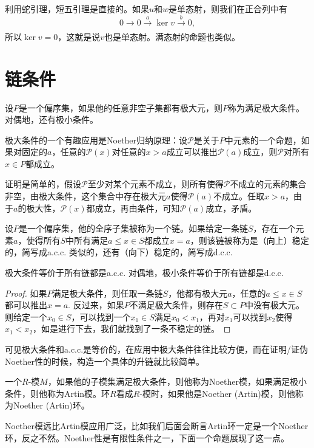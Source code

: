 利用蛇引理，短五引理是直接的。如果$u$和$w$是单态射，则我们在正合列中有
\[
	0\to 0 \xrightarrow[~~~]{a}\ker v \xrightarrow[~~~]{b}0,
\]
所以$\ker v=0$，这就是说$v$也是单态射。满态射的命题也类似。

\section{链条件}

\para 设$P$是一个偏序集，如果他的任意非空子集都有极大元，则$P$称为满足极大条件。对偶地，还有极小条件。

极大条件的一个有趣应用是Noether归纳原理：设$\mathcal{P}$是关于$P$中元素的一个命题，如果对固定的$a$，任意的$\mathcal{P}(x)$对任意的$x>a$成立可以推出$\mathcal{P}(a)$成立，则$\mathcal{P}$对所有$x\in P$都成立。

证明是简单的，假设$\mathcal{P}$至少对某个元素不成立，则所有使得$\mathcal{P}$不成立的元素的集合非空，由极大条件，这个集合中存在极大元$a$使得$\mathcal{P}(a)$不成立。任取$x>a$，由于$a$的极大性，$\mathcal{P}(x)$都成立，再由条件，可知$\mathcal{P}(a)$成立，矛盾。

\para 设$P$是一个偏序集，他的全序子集被称为一个链。如果给定一条链$S$，存在一个元素$a$，使得所有$S$中所有满足$a\leq x\in S$都成立$x=a$，则该链被称为是（向上）稳定的，简写成a.c.c. 类似的，还有（向下）稳定的，简写成d.c.c.

\begin{pro}
极大条件等价于所有链都是a.c.c. 对偶地，极小条件等价于所有链都是d.c.c.
\end{pro}

\begin{proof}
	如果$P$满足极大条件，则任取一条链$S$，他都有极大元$a$，任意的$a\leq x\in S$都可以推出$x=a$. 反过来，如果$P$不满足极大条件，则存在$S\subset P$中没有极大元。则给定一个$x_0\in S$，可以找到一个$x_1\in S$满足$x_0<x_1$，再对$x_1$可以找到$x_2$使得$x_1<x_2$，如是进行下去，我们就找到了一条不稳定的链。
\end{proof}

可见极大条件和a.c.c.是等价的，在应用中极大条件往往比较方便，而在证明/证伪Noether性的时候，构造一个具体的升链就比较简单。

\para 一个$R$-模$M$，如果他的子模集满足极大条件，则他称为Noether模，如果满足极小条件，则他称为Artin模。环$R$看成$R$-模时，如果他是Noether (Artin)模，则他称为Noether (Artin)环。

Noether模远比Artin模应用广泛，比如我们后面会断言Artin环一定是一个Noether环，反之不然。Noether性是有限性条件之一，下面一个命题展现了这一点。

